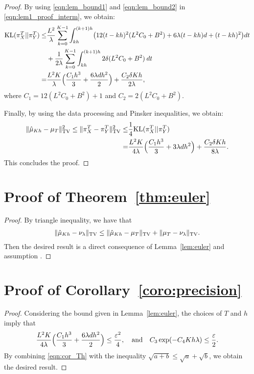 \begin{proof}
By using \eqref{eqn:lem_bound1} and \eqref{eqn:lem_bound2} in \eqref{eqn:lem1_proof_interm}, we obtain:
\begin{align}
\nonumber \textnormal{KL} (\pi_{X}^T || \pi_{Y}^T) \leq& \frac{L^2}{\lambda} \sum_{k=0}^{K-1} \int_{kh}^{(k+1)h} \bigl(12(t-kh)^2 (L^2 C_0 + B^2) + 6\lambda (t-kh)d +(t-kh)^2 \bigr) dt\\
&+  \frac1{2 \lambda} \sum_{k=0}^{K-1} \int_{kh}^{(k+1)h} 2 \delta(L^2 C_0 + B^2) \> dt \\
=& \frac{L^2 K}{\lambda} \Bigl( \frac{C_1 h^3}{3} + \frac{6 \lambda d h^2}{2} \Bigr) + \frac{C_2 \delta K h}{2\lambda},
\end{align}
where $C_1 = 12(L^2 C_0 + B^2)+1$ and $C_2 = 2 (L^2 C_0 + B^2)$.

Finally, by using the data processing and Pinsker inequalities, we obtain:
\begin{align}
\| \hat{\mu}_{Kh} - \mu_{T} \|_{\textnormal{TV}}^2 \leq \| \pi_{X}^T - \pi_{Y}^T \|_{\textnormal{TV}}^2 \leq& \frac1{4} \textnormal{KL} (\pi_{X}^T || \pi_{Y}^T) \\
=& \frac{L^2 K}{4\lambda} \Bigl( \frac{C_1 h^3}{3} + 3 \lambda d h^2 \Bigr) + \frac{C_2 \delta K h}{8\lambda}.
\end{align}
This concludes the proof.
%
\end{proof}


\section{Proof of Theorem~\ref{thm:euler}}
%
\begin{proof}
By triangle inequality, we have that
\begin{align}
\| \hat{\mu}_{Kh} - \nu_\lambda \|_{\textnormal{TV}} \leq \| \hat{\mu}_{Kh} - \mu_{T} \|_{\textnormal{TV}} + \| \mu_{T} - \nu_\lambda \|_{\textnormal{TV}}.
\end{align}
Then the desired result is a direct consequence of Lemma~\ref{lem:euler} and assumption .
\end{proof}

\section{Proof of Corollary~\ref{coro:precision}}
\begin{proof}
Considering the bound given in Lemma~\ref{lem:euler}, the choices of $T$ and $h$ imply that
\begin{align}
\frac{L^2 K}{4\lambda} \Bigl( \frac{C_1 h^3}{3} + \frac{6 \lambda d h^2}{2} \Bigr) \leq \frac{\varepsilon^2}{4}, \quad \text{and} \quad C_3 \exp(-C_4 Kh \lambda) \leq \frac{\varepsilon}{2}. \label{eqn:cor_Th}
\end{align}
By combining \eqref{eqn:cor_Th} with the inequality $\sqrt{a+b}\leq \sqrt{a} + \sqrt{b}$, we obtain the desired result. 
\end{proof}

